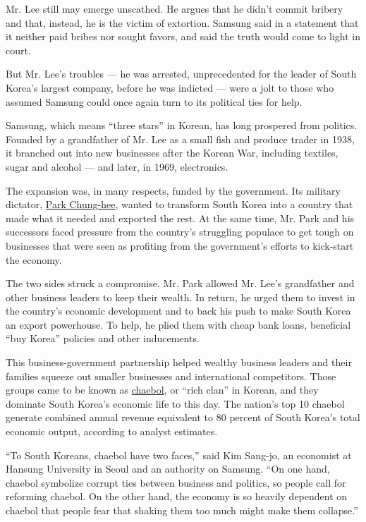 Mr. Lee still may emerge unscathed. He argues that he didn't commit
bribery and that, instead, he is the victim of extortion. Samsung said
in a statement that it neither paid bribes nor sought favors, and said
the truth would come to light in court.

But Mr. Lee's troubles --- he was arrested, unprecedented for the leader
of South Korea's largest company, before he was indicted --- were a jolt
to those who assumed Samsung could once again turn to its political ties
for help.

Samsung, which means ``three stars'' in Korean, has long prospered from
politics. Founded by a grandfather of Mr. Lee as a small fish and
produce trader in 1938, it branched out into new businesses after the
Korean War, including textiles, sugar and alcohol --- and later, in
1969, electronics.

The expansion was, in many respects, funded by the government. Its
military dictator,
\href{http://www.nytimes.com/1995/11/24/world/ruthless-ex-dictator-getting-credit-for-south-korea-s-rise.html}{Park
Chung-hee}, wanted to transform South Korea into a country that made
what it needed and exported the rest. At the same time, Mr. Park and his
successors faced pressure from the country's struggling populace to get
tough on businesses that were seen as profiting from the government's
efforts to kick-start the economy.

The two sides struck a compromise. Mr. Park allowed Mr. Lee's
grandfather and other business leaders to keep their wealth. In return,
he urged them to invest in the country's economic development and to
back his push to make South Korea an export powerhouse. To help, he
plied them with cheap bank loans, beneficial ``buy Korea'' policies and
other inducements.

This business-government partnership helped wealthy business leaders and
their families squeeze out smaller businesses and international
competitors. Those groups came to be known as
\href{https://www.nytimes.com/2017/02/17/business/south-korea-chaebol-samsung.html}{chaebol},
or ``rich clan'' in Korean, and they dominate South Korea's economic
life to this day. The nation's top 10 chaebol generate combined annual
revenue equivalent to 80 percent of South Korea's total economic output,
according to analyst estimates.

``To South Koreans, chaebol have two faces,'' said Kim Sang-jo, an
economist at Hansung University in Seoul and an authority on Samsung.
``On one hand, chaebol symbolize corrupt ties between business and
politics, so people call for reforming chaebol. On the other hand, the
economy is so heavily dependent on chaebol that people fear that shaking
them too much might make them collapse.''

